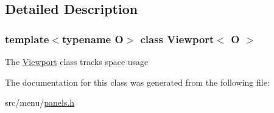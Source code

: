 \subsection{Detailed Description}
\subsubsection*{template$<$typename O$>$\newline
class Viewport$<$ O $>$}

The \hyperlink{classViewport}{Viewport} class tracks space usage 

The documentation for this class was generated from the following file\+:\begin{DoxyCompactItemize}
\item 
src/menu/\hyperlink{panels_8h}{panels.\+h}\end{DoxyCompactItemize}
